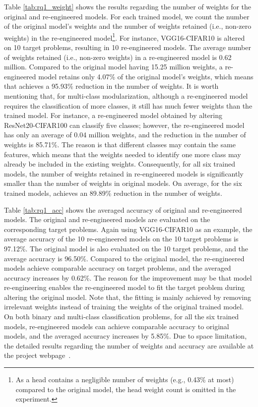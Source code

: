 Table \ref{tab:rq1_weight} shows the results regarding the number of weights for the original and re-engineered models.
For each trained model, we count the number of the original model's weights and the number of weights retained (i.e., non-zero weights) in the re-engineered model\footnote{As a head contains a negligible number of weights (e.g., 0.43\% at most) compared to the original model, the head weight count is omitted in the experiment.}.
For instance, VGG16-CIFAR10 is altered on 10 target problems, resulting in 10 re-engineered models.
The average number of weights retained (i.e., non-zero weights) in a re-engineered model is 0.62 million.
Compared to the original model having 15.25 million weights, a re-engineered model retains only 4.07\% of the original model's weights, which means that \projectName achieves a 95.93\% reduction in the number of weights.
It is worth mentioning that, for multi-class modularization, although a re-engineered model requires the classification of more classes, it still has much fewer weights than the trained model. 
For instance, a re-engineered model obtained by altering ResNet20-CIFAR100 can classify five classes; however, the re-engineered model has only an average of 0.04 million weights, and the reduction in the number of weights is 85.71\%.
The reason is that different classes may contain the same features, which means that the weights needed to identify one more class may already be included in the existing weights.
Consequently, for all six trained models, the number of weights retained in re-engineered models is significantly smaller than the number of weights in original models.
On average, for the six trained models, \projectName achieves an 89.89\% reduction in the number of weights.






Table \ref{tab:rq1_acc} shows the averaged accuracy of original and re-engineered models.
The original and re-engineered models are evaluated on the corresponding target problems. 
Again using VGG16-CIFAR10 as an example, the average accuracy of the 10 re-engineered models on the 10 target problems is 97.12\%.
The original model is also evaluated on the 10 target problems, and the average accuracy is 96.50\%. 
Compared to the original model, the re-engineered models achieve comparable accuracy on target problems, and the averaged accuracy increases by 0.62\%.
The reason for the improvement may be that model re-engineering enables the re-engineered model to fit the target problem during altering the original model.
Note that, the fitting is mainly achieved by removing irrelevant weights instead of training the weights of the original trained model.
On both binary and multi-class classification problems, for all the six trained models, re-engineered models can achieve comparable accuracy to original models, and the averaged accuracy increases by 5.85\%.
Due to space limitation, the detailed results regarding the number of weights and accuracy are available at the project webpage~\cite{seam}.



